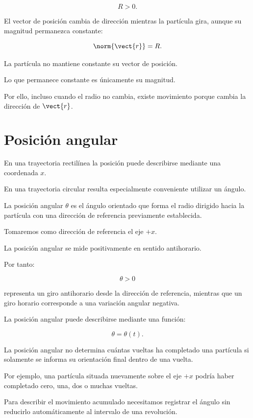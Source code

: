 \[
R>0.
\]

El vector de posición cambia de dirección mientras la partícula gira, aunque
su magnitud permanezca constante:

\[
\norm{\vect{r}}=R.
\]

\begin{interpretacion}

La partícula no mantiene constante su vector de posición.

Lo que permanece constante es únicamente su magnitud.

Por ello, incluso cuando el radio no cambia, existe movimiento porque cambia
la dirección de \(\vect{r}\).

\end{interpretacion}


\section{Posición angular}

En una trayectoria rectilínea la posición puede describirse mediante una
coordenada \(x\).

En una trayectoria circular resulta especialmente conveniente utilizar un
ángulo.

\begin{definicion}

La posición angular \(\theta\) es el ángulo orientado que forma el radio
dirigido hacia la partícula con una dirección de referencia previamente
establecida.

\end{definicion}

Tomaremos como dirección de referencia el eje \(+x\).

La posición angular se mide positivamente en sentido antihorario.

Por tanto:

\[
\theta>0
\]

representa un giro antihorario desde la dirección de referencia, mientras que
un giro horario corresponde a una variación angular negativa.

La posición angular puede describirse mediante una función:

\[
\boxed{\theta=\theta(t)}.
\]

\begin{advertencia}

La posición angular no determina cuántas vueltas ha completado una partícula si
solamente se informa su orientación final dentro de una vuelta.

Por ejemplo, una partícula situada nuevamente sobre el eje \(+x\) podría
haber completado cero, una, dos o muchas vueltas.

Para describir el movimiento acumulado necesitamos registrar el ángulo sin
reducirlo automáticamente al intervalo de una revolución.

\end{advertencia}


